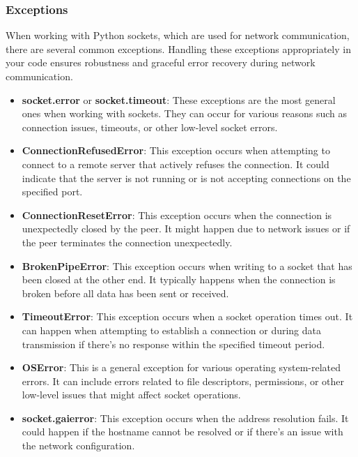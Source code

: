 \newpage
\subsubsection{Exceptions}
When working with Python sockets, which are used for network communication, there are several common exceptions. Handling these exceptions appropriately in your code ensures robustness and graceful error recovery during network communication.

\begin{itemize}
    \item \textbf{socket.error} or \textbf{socket.timeout}: These exceptions are the most general ones when working with sockets. They can occur for various reasons such as connection issues, timeouts, or other low-level socket errors.
    
    \item \textbf{ConnectionRefusedError}: This exception occurs when attempting to connect to a remote server that actively refuses the connection. It could indicate that the server is not running or is not accepting connections on the specified port.
    
    \item \textbf{ConnectionResetError}: This exception occurs when the connection is unexpectedly closed by the peer. It might happen due to network issues or if the peer terminates the connection unexpectedly.
    
    \item \textbf{BrokenPipeError}: This exception occurs when writing to a socket that has been closed at the other end. It typically happens when the connection is broken before all data has been sent or received.
    
    \item \textbf{TimeoutError}: This exception occurs when a socket operation times out. It can happen when attempting to establish a connection or during data transmission if there's no response within the specified timeout period.
    
    \item \textbf{OSError}: This is a general exception for various operating system-related errors. It can include errors related to file descriptors, permissions, or other low-level issues that might affect socket operations.
    
    \item \textbf{socket.gaierror}: This exception occurs when the address resolution fails. It could happen if the hostname cannot be resolved or if there's an issue with the network configuration.
    

\end{itemize}
